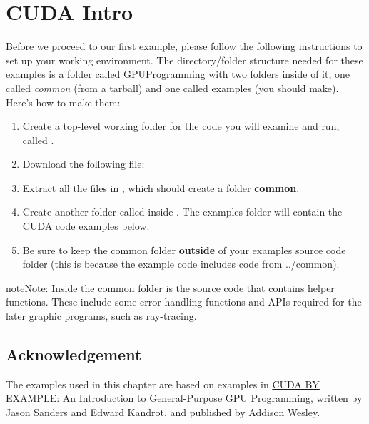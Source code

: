 \documentclass[letterpaper,10pt,openany,oneside]{sphinxmanual}
\begin{document}
\chapter{CUDA Intro}
\label{CUDAIntro/CUDAIntro:opencl}\label{CUDAIntro/CUDAIntro::doc}\label{CUDAIntro/CUDAIntro:cuda-intro}
Before we proceed to our first example, please follow the following instructions to set up your working environment.  The directory/folder structure needed for these examples is a folder called GPUProgramming with two folders inside of it, one called \emph{common} (from a tarball) and one called examples (you should make). Here's how to make them:
\begin{enumerate}
\item {} 
Create a top-level working folder for the code you will examine and run, called .

\item {} 
Download the following file: 

\item {} 
Extract all the files in , which should create a folder \textbf{common}.

\item {} 
Create another folder called  inside . The examples folder will contain the CUDA code examples below.

\item {} 
Be sure to keep the common folder \textbf{outside} of your examples source code folder (this is because the example code includes code from ../common).

\end{enumerate}

\begin{notice}{note}{Note:}
Inside the common folder is the source code that contains helper functions. These include some error handling functions and APIs required for the later graphic programs, such as ray-tracing.
\end{notice}


\section{Acknowledgement}
\label{CUDAIntro/CUDAIntro:acknowledgement}
The examples used in this chapter are based on examples in \href{http://developer.nvidia.com/content/cuda-example-introduction-general-purpose-gpu-programming-0}{CUDA BY EXAMPLE: An Introduction to General-Purpose GPU Programming}, written by Jason Sanders and Edward Kandrot, and published by Addison Wesley.
\end{document}
